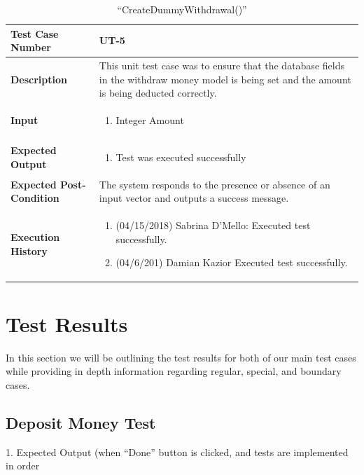 \documentclass[12pt]{article}
\begin{document}
\begin{table}[H]
\caption{“CreateDummyWithdrawal()”}
\begin{center}
\begin{tabular}{|p{5.5cm}|p{11cm}|}
  \hline
  \bf Test Case Number & UT-5	\\\hline
  \bf Description & 
This unit test case was to ensure that the database fields in the withdraw money model is being set and the amount is being deducted correctly.\\\hline
  \bf Input &
  \begin{enumerate}
  \item Integer Amount
  \end{enumerate}
  \\\hline
  \bf Expected Output &
  \begin{enumerate}
  \item Test was executed successfully
  \end{enumerate}
  \\\hline
  \bf Expected Post-Condition & 
  The system responds to the presence or absence of an input vector and outputs a success message.
  \\\hline   
  \bf Execution History & 
  \begin{enumerate}
  \item (04/15/2018) Sabrina D’Mello: Executed test successfully.
  \item (04/6/201) Damian Kazior Executed test successfully.
  \end{enumerate}
  \\\hline
\end{tabular}
\end{center}
\end{table}

\section{Test Results}

In this section we will be outlining the test results for both of our main test cases while providing in depth information regarding regular, special, and boundary cases. 

\subsection{Deposit Money Test}

1. Expected Output (when ``Done'' button is clicked, and tests are implemented in order\\
\end{document}
